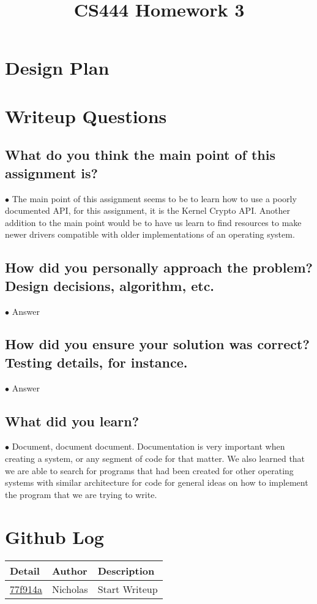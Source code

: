 \documentclass[letterpaper,10pt,fleqn,draftclsnofoot,onecolumn]{IEEEtran}
\title{CS444 Homework 3}
\author{\name}
\begin{document}
	\maketitle
	\hrulefill
	\section*{Design Plan}
	
	\section*{Writeup Questions}
	
	\subsection{What do you think the main point of this assignment is?}
	$\bullet$ The main point of this assignment seems to be to learn how to use a poorly documented API, for this assignment, it is the Kernel Crypto API. Another addition to the main point would be to have us learn to find resources to make newer drivers compatible with older implementations of an operating system.
	
	\subsection{How did you personally approach the problem? Design decisions, algorithm, etc.}
	$\bullet$ Answer	
	
	\subsection{How did you ensure your solution was correct? Testing details, for instance.}
	$\bullet$ Answer
	
	\subsection{What did you learn?}
	$\bullet$ Document, document document. Documentation is very important when creating a system, or any segment of code for that matter. We also learned that we are able to search for programs that had been created for other operating systems with similar architecture for code for general ideas on how to implement the program that we are trying to write.

	\section*{ Github Log }
	\begin{tabular}{l l p{1.5in}}\textbf{Detail} & \textbf{Author} & \textbf{Description}\\\hline
		\href{https://github.com/Skinnern/CS444/commit/77f914a6fe466b8115d31d7a97e08b2e86b00b7a}{77f914a} & Nicholas & Start Writeup\\\hline
	\end{tabular}
	
\end{document}

